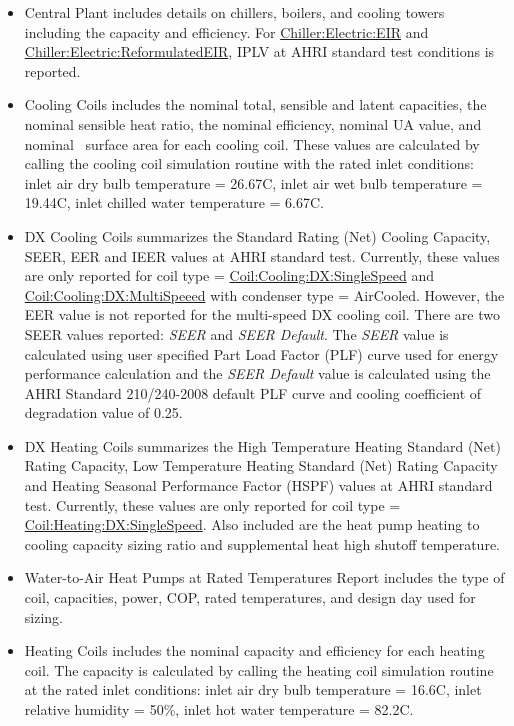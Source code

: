 \begin{itemize}
\item
  Central Plant includes details on chillers, boilers, and cooling towers including the capacity and efficiency. For \hyperref[chillerelectriceir]{Chiller:Electric:EIR} and \hyperref[chillerelectricreformulatedeir]{Chiller:Electric:ReformulatedEIR}, IPLV at AHRI standard test conditions is reported.
\item
  Cooling Coils includes the nominal total, sensible and latent capacities, the nominal sensible heat ratio, the nominal efficiency, nominal UA value, and nominal~ surface area for each cooling coil. These values are calculated by calling the cooling coil simulation routine with the rated inlet conditions: inlet air dry bulb temperature = 26.67C, inlet air wet bulb temperature = 19.44C, inlet chilled water temperature = 6.67C.
\item
  DX Cooling Coils summarizes the Standard Rating (Net) Cooling Capacity, SEER, EER and IEER values at AHRI standard test. Currently, these values are only reported for coil type = \hyperref[coilcoolingdxsinglespeed]{Coil:Cooling:DX:SingleSpeed} and \hyperref[coilcoolingdxmultispeed]{Coil:Cooling:DX:MultiSpeeed} with condenser type = AirCooled. However, the EER value is not reported for the multi-speed DX cooling coil. There are two SEER values reported: \textit{SEER} and \textit{SEER Default}. The \textit{SEER} value is calculated using user specified Part Load Factor (PLF) curve used for energy performance calculation and the \textit{SEER Default} value is calculated using the AHRI Standard 210/240-2008 default PLF curve and cooling coefficient of degradation value of 0.25.
\item
  DX Heating Coils summarizes the High Temperature Heating Standard (Net) Rating Capacity, Low Temperature Heating Standard (Net) Rating Capacity and Heating Seasonal Performance Factor (HSPF) values at AHRI standard test. Currently, these values are only reported for coil type = \hyperref[coilheatingdxsinglespeed]{Coil:Heating:DX:SingleSpeed}. Also included are the heat pump heating to cooling capacity sizing ratio and supplemental heat high shutoff temperature.
\item
  Water-to-Air Heat Pumps at Rated Temperatures Report includes the type of coil, capacities, power, COP, rated temperatures, and design day used for sizing.
\item
  Heating Coils includes the nominal capacity and efficiency for each heating coil. The capacity is calculated by calling the heating coil simulation routine at the rated inlet conditions: inlet air dry bulb temperature = 16.6C, inlet relative humidity = 50\%, inlet hot water temperature = 82.2C.

\end{itemize}
